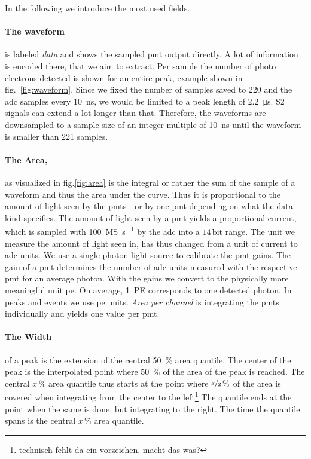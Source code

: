 In the following we introduce the most used fields.

\paragraph{The waveform} is labeled \emph{data} and shows the sampled \gls{pmt} output directly.
A lot of information is encoded there, that we aim to extract.
Per sample the number of photo electrons detected is shown for an entire peak, example shown in fig.~\ref{fig:waveform}.
Since we fixed the number of samples saved to 220 and the \gls{adc} samples every \SI{10}{\nano\second}, we would be limited to a peak length of \SI{2.2}{\micro\second}.
S2 signals can extend a lot longer than that.
Therefore, the waveforms are downsampled to a sample size of an integer multiple of \SI{10}{\nano\second} until the waveform is smaller than 221 samples.

\paragraph{The Area,} as visualized in fig.\ref{fig:area} is the integral or  rather the sum of the sample of a waveform and thus the area under the curve.
Thus it is proportional to the amount of light seen by the \gls{pmt}s - or by one \gls{pmt} depending on what the data kind specifies.
The amount of light seen by a \gls{pmt} yields a proportional current, which is sampled with \SI{100}{\mega S\per\second} by the \gls{adc} into a $ 14\,\mathrm{bit} $ range.
The unit we measure the amount of light seen in, has thus changed from a unit of current to \gls{adc}-units.
We use a single-photon light source to calibrate the \gls{pmt}-gains.
The gain of a \gls{pmt} determines the number of \gls{adc}-units measured with the respective \gls{pmt} for an average photon.
With the gains we convert to the physically more meaningful unit \gls{pe}.
On average, \SI{1}{PE} corresponds to one detected photon.
In peaks and events we use \gls{pe} units.
\emph{Area per channel} is integrating the \gls{pmt}s individually and yields one value per \gls{pmt}.

\paragraph{The Width} of a peak is the extension of the central \SI{50}{\%} area quantile.
The center of the peak is the interpolated point where \SI{50}{\%} of the area of the peak is reached.
The central $ x\,\% $ area quantile thus starts at the point where $ \nicefrac{x}{2}\,\% $ of the area is covered when integrating from the center to the left\footnote{technisch fehlt da ein vorzeichen. macht das was?}
The quantile ends at the point when the same is done, but integrating to the right.
The time the quantile spans is the central $ x\,\% $ area quantile.

